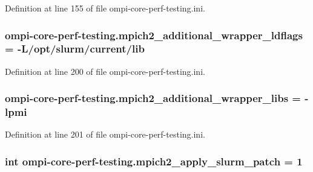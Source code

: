Definition at line 155 of file ompi-\/core-\/perf-\/testing.\-ini.

\hypertarget{namespaceompi-core-perf-testing_af90676eacbf08c8cdca48d2e50078288}{
\subsubsection[{mpich2\-\_\-additional\-\_\-wrapper\-\_\-ldflags}]{\setlength{\rightskip}{0pt plus 5cm}ompi-\/core-\/perf-\/testing.\-mpich2\-\_\-additional\-\_\-wrapper\-\_\-ldflags = -\/L/opt/slurm/current/lib}}\label{namespaceompi-core-perf-testing_af90676eacbf08c8cdca48d2e50078288}


Definition at line 200 of file ompi-\/core-\/perf-\/testing.\-ini.

\hypertarget{namespaceompi-core-perf-testing_af773f6fadd7d590602ecd2dd9b5ab051}{
\subsubsection[{mpich2\-\_\-additional\-\_\-wrapper\-\_\-libs}]{\setlength{\rightskip}{0pt plus 5cm}ompi-\/core-\/perf-\/testing.\-mpich2\-\_\-additional\-\_\-wrapper\-\_\-libs = -\/lpmi}}\label{namespaceompi-core-perf-testing_af773f6fadd7d590602ecd2dd9b5ab051}


Definition at line 201 of file ompi-\/core-\/perf-\/testing.\-ini.

\hypertarget{namespaceompi-core-perf-testing_a1ef643f02998e769b3601fe0312d35a2}{
\subsubsection[{mpich2\-\_\-apply\-\_\-slurm\-\_\-patch}]{\setlength{\rightskip}{0pt plus 5cm}int ompi-\/core-\/perf-\/testing.\-mpich2\-\_\-apply\-\_\-slurm\-\_\-patch = 1}}\label{namespaceompi-core-perf-testing_a1ef643f02998e769b3601fe0312d35a2}


